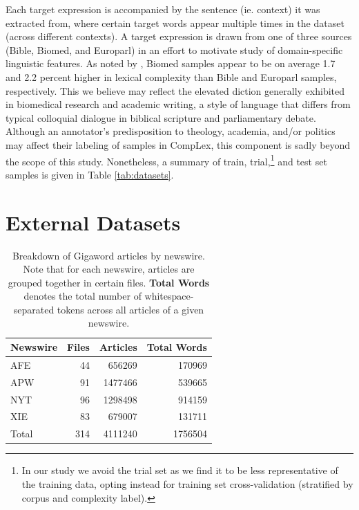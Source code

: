 \documentclass{dcthesis}
\theoremstyle{definition}
\theoremstyle{remark}
\begin{document}
Each target expression is accompanied by the sentence (ie. context) it was extracted from, where certain target words appear multiple times in the dataset (across different contexts). A target expression is drawn from one of three sources (Bible, Biomed, and Europarl) in an effort to motivate study of domain-specific linguistic features. As noted by \citet{shardlow2020complex}, Biomed samples appear to be on average 1.7 and 2.2 percent higher in lexical complexity than Bible and Europarl samples, respectively. This we believe may reflect the elevated diction generally exhibited in biomedical research and academic writing, a style of language that differs from typical colloquial dialogue in biblical scripture and parliamentary debate. Although an annotator's predisposition to theology, academia, and/or politics may affect their labeling of samples in CompLex, this component is sadly beyond the scope of this study. Nonetheless, a summary of train, trial,\footnote{In our study we avoid the trial set as we find it to be less representative of the training data, opting instead for training set cross-validation (stratified by corpus and complexity label).} and test set samples is given in Table \ref{tab:datasets}.

\section{External Datasets}

\begin{table}
  \centering
  \begin{tabular}{l|rrr}
    \hline
    \centering
    \textbf{Newswire} & \textbf{Files} & \textbf{Articles} & \textbf{Total Words} \\
    \hline
    AFE & 44 &   656269 & 170969  \\
    APW & 91 &   1477466 & 539665\\
    NYT & 96 &   1298498 & 914159 \\
    XIE & 83 &   679007  & 131711\\
    \hline
    Total & 314 & 4111240 & 1756504\\
    \hline
  \end{tabular}
  \caption{\label{tab:gigaword_breakdown} Breakdown of Gigaword articles by newswire. Note that for each newswire, articles are grouped together in certain files. \textbf{Total Words} denotes the total number of whitespace-separated tokens across all articles of a given newswire.}
\end{table}
\end{document}
